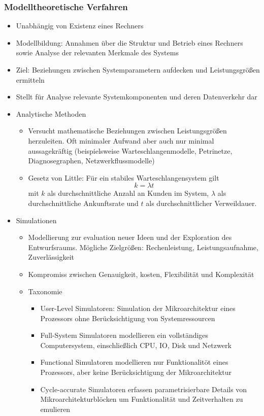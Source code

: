 \subsubsection{Modelltheoretische Verfahren}
\begin{itemize}
	\item Unabhängig von Existenz eines Rechners
		\item Modellbildung: Annahmen über die Struktur und Betrieb eines Rechners sowie Analyse der relevanten Merkmale des Systems 
		\item Ziel: Beziehungen zwischen Systemparametern aufdecken und Leistungsgrößen ermitteln
		\item Stellt für Analyse relevante Systemkomponenten und deren Datenverkehr dar
		\item Analytische Methoden
		\begin{itemize}
			\item Versucht mathematische Beziehungen zwischen Leistungsgrößen herzuleiten. Oft minimaler Aufwand aber auch nur minimal aussagekräftig (beispielsweise Warteschlangenmodelle, Petrinetze, Diagnosegraphen, Netzwerkflussmodelle)
			\item Gesetz von Little: Für ein stabiles Warteschlangensystem gilt \[k=\lambda t\] mit $k$ als durchschnittliche Anzahl an Kunden im System, $\lambda$ als durchschnittliche Ankunftsrate und $t$ als durchschnittlicher Verweildauer.
		\end{itemize}
	\item Simulationen
	\begin{itemize}
		\item Modellierung zur evaluation neuer Ideen und der Exploration des Entwurfsraums. Mögliche Zielgrößen: Rechenleistung, Leistungsaufnahme, Zuverlässigkeit
		\item Kompromiss zwischen Genauigkeit, kosten, Flexibilität und Komplexität
		\item Taxonomie
		\begin{itemize}
			\item User-Level Simulatoren: Simulation der Mikroarchitektur eines Prozessors ohne Berücksichtigung von Systemressourcen
			\item Full-System Simulatoren modellieren ein vollständiges Computersystem, einschließlich CPU, IO, Disk und Netzwerk	
			\item Functional Simulatoren modellieren nur Funktionalitöt eines Prozessors, aber keine Berücksichtigung der Mikroarchitektur
			\item Cycle-accurate Simulatoren erfassen parametrisierbare Details von Mikroarchitekturblöcken um Funktionalität und Zeitverhalten zu emulieren

\end{itemize}
\end{itemize}
\end{itemize}
